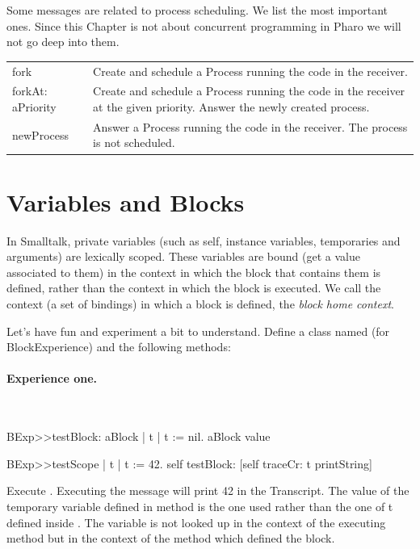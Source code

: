 \documentclass[a4paper,10pt,twoside]{book}
\begin{document}
Some messages are related to process scheduling. We list the most important ones. Since this Chapter is not about concurrent programming in Pharo we will not go deep into them.

\begin{tabular}{p{2.5cm}|p{8cm}}
\textsf{fork}&Create and schedule a Process running the code in the receiver.\\
\textsf{forkAt: aPriority}& Create and schedule a Process running the code in the receiver at the given priority. Answer the newly created process. \\
\textsf{newProcess}&Answer a Process running the code in the receiver. The process is not scheduled.\\
\end{tabular}


\section{Variables and Blocks}
In Smalltalk, private variables (such as self, instance variables, temporaries and arguments) are 
lexically scoped. These variables are bound (get a value associated to them) in the context in which the block that contains them is defined, rather than the context in which the block is executed.  We call the context (a set of bindings) in which a block is defined, the \emph{block home context}.


Let's have fun and experiment a bit to understand. 
Define a class named  (for BlockExperience) and the following methods:

\paragraph{Experience one.}\ 

\begin{code}{}
BExp>>testBlock: aBlock 
	| t | 
	t := nil. 
	aBlock value 
	
BExp>>testScope 
	| t | 
	t := 42. 
	self testBlock: [self traceCr: t printString] 
\end{code}

Execute . Executing the  message will print 42 in the Transcript. The value of the temporary variable  defined in method  is the one used rather than the one of t defined inside .
The variable  is not looked up in the context of the executing method  but in the context of the method  which defined the block.
\end{document}
